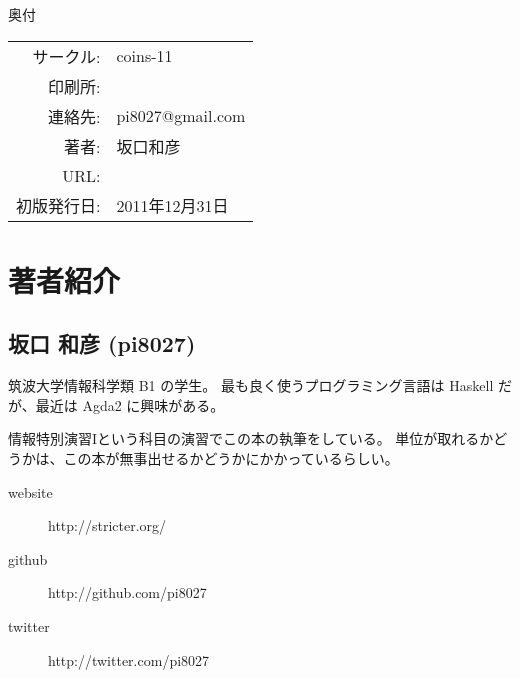 \pagestyle{empty}
\begin{itembox}[1]{奥付}
\begin{tabular}{rl}
サークル:   & coins-11 \\
印刷所:     & \\
連絡先:     & pi8027@gmail.com \\
著者:       & 坂口和彦 \\
URL:        &  \\
初版発行日: & 2011年12月31日 \\
\end{tabular}
\end{itembox}

\section*{著者紹介}

\subsection*{坂口 和彦 (pi8027)}

筑波大学情報科学類 B1 の学生。
最も良く使うプログラミング言語は Haskell だが、最近は Agda2 に興味がある。

情報特別演習Iという科目の演習でこの本の執筆をしている。
単位が取れるかどうかは、この本が無事出せるかどうかにかかっているらしい。

\begin{description}
\item[website] http://stricter.org/
\item[github] http://github.com/pi8027
\item[twitter] http://twitter.com/pi8027
\end{description}


